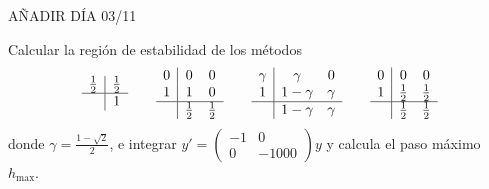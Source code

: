 

















AÑADIR D\'IA 03/11

\begin{ejer}    
    Calcular la regi\'on de estabilidad de los m\'etodos
$$\begin{array}{c|cc}
    \frac{1}{2} & \frac{1}{2}  \\
    \hline  & 1
\end{array} \qquad \begin{array}{c|cc}
    0 & 0 & 0 \\
    1 & 1 & 0 \\
    \hline  & \frac{1}{2} & \frac{1}{2}
\end{array} \qquad \begin{array}{c|cc}
    \gamma & \gamma & 0 \\
    1 & 1-\gamma & \gamma \\
    \hline  & 1-\gamma & \gamma
\end{array} \qquad \begin{array}{c|cc}
    0 & 0 & 0 \\
    1 & \frac{1}{2} & \frac{1}{2} \\
    \hline  & \frac{1}{2} & \frac{1}{2}
\end{array} $$
donde $\gamma = \frac{1-\sqrt{2}}{2}$, e integrar $y'= \left( \begin{smallmatrix}
    -1 & 0 \\ 0 & -1000
\end{smallmatrix} \right) y$ y calcula el paso m\'aximo $h_{\max}$.
\end{ejer}
